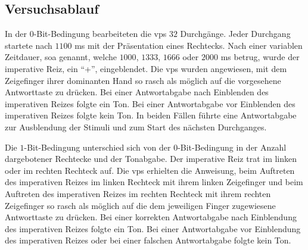 \documentclass[11pt, twoside, a4paper]{book}		%
\begin{document}
%				
%				
%				
%			




\subsection{Versuchsablauf \label{subsec:hick_Versuchsablauf}}


In der $0$-Bit-Bedingung bearbeiteten die \glspl{vp} $32$ Durchgänge. Jeder Durchgang startete nach $1100$ ms mit der Präsentation eines Rechtecks. Nach einer variablen Zeitdauer, \gls{soa} genannt, welche $1000$, $1333$, $1666$ oder $2000$ ms betrug, wurde der imperative Reiz, ein \enquote{+}, eingeblendet. Die \glspl{vp} wurden angewiesen, mit dem Zeigefinger ihrer dominanten Hand so rasch als möglich auf die vorgesehene Antworttaste zu drücken. Bei einer Antwortabgabe nach Einblenden des imperativen Reizes folgte ein Ton. Bei einer Antwortabgabe vor Einblenden des imperativen Reizes folgte kein Ton. In beiden Fällen führte eine Antwortabgabe zur Ausblendung der Stimuli und zum Start des nächsten Durchganges.

Die $1$-Bit-Bedingung unterschied sich von der $0$-Bit-Bedingung in der Anzahl dargebotener Rechtecke und der Tonabgabe. Der imperative Reiz trat im linken oder im rechten Rechteck auf. Die \glspl{vp} erhielten die Anweisung, beim Auftreten des imperativen Reizes im linken Rechteck mit ihrem linken Zeigefinger und beim Auftreten des imperativen Reizes im rechten Rechteck mit ihrem rechten Zeigefinger so rasch als möglich auf die dem jeweiligen Finger zugewiesene Antworttaste zu drücken. Bei einer korrekten Antwortabgabe nach Einblendung des imperativen Reizes folgte ein Ton. Bei einer Antwortabgabe vor Einblendung des imperativen Reizes oder bei einer falschen Antwortabgabe folgte kein Ton.
\end{document}
